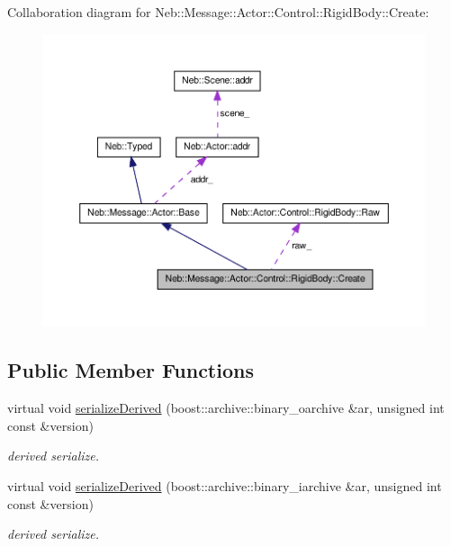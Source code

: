 \-Collaboration diagram for \-Neb\-:\-:\-Message\-:\-:\-Actor\-:\-:\-Control\-:\-:\-Rigid\-Body\-:\-:\-Create\-:
\nopagebreak
\begin{figure}[H]
\begin{center}
\leavevmode
\includegraphics[width=350pt]{classNeb_1_1Message_1_1Actor_1_1Control_1_1RigidBody_1_1Create__coll__graph}
\end{center}
\end{figure}
\subsection*{\-Public \-Member \-Functions}
\begin{DoxyCompactItemize}
\item 
\hypertarget{classNeb_1_1Message_1_1Actor_1_1Control_1_1RigidBody_1_1Create_aa390bc059f2eea71aed8d255faf23509}{virtual void \hyperlink{classNeb_1_1Message_1_1Actor_1_1Control_1_1RigidBody_1_1Create_aa390bc059f2eea71aed8d255faf23509}{serialize\-Derived} (boost\-::archive\-::binary\-\_\-oarchive \&ar, unsigned int const \&version)}\label{classNeb_1_1Message_1_1Actor_1_1Control_1_1RigidBody_1_1Create_aa390bc059f2eea71aed8d255faf23509}

\begin{DoxyCompactList}\small\item\em derived serialize. \end{DoxyCompactList}\item 
\hypertarget{classNeb_1_1Message_1_1Actor_1_1Control_1_1RigidBody_1_1Create_a6784429360fa42e6146a696d7e164731}{virtual void \hyperlink{classNeb_1_1Message_1_1Actor_1_1Control_1_1RigidBody_1_1Create_a6784429360fa42e6146a696d7e164731}{serialize\-Derived} (boost\-::archive\-::binary\-\_\-iarchive \&ar, unsigned int const \&version)}\label{classNeb_1_1Message_1_1Actor_1_1Control_1_1RigidBody_1_1Create_a6784429360fa42e6146a696d7e164731}

\begin{DoxyCompactList}\small\item\em derived serialize. \end{DoxyCompactList}\end{DoxyCompactItemize}
